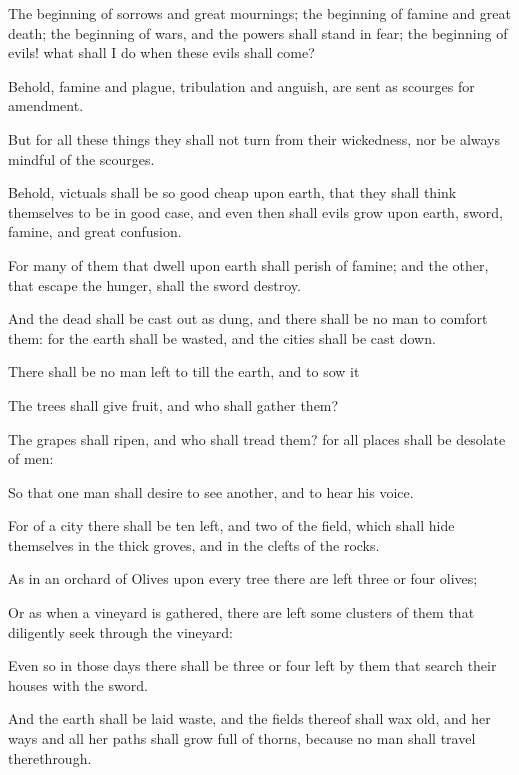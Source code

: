 {\par }{\PP {}The beginning of sorrows and great mournings; the beginning of famine and great death; the beginning of wars, and the powers shall stand in fear; the beginning of evils! what shall I do when these evils shall come?
\par }{\PP {}Behold, famine and plague, tribulation and anguish, are sent as scourges for amendment.
\par }{\PP {}But for all these things they shall not turn from their wickedness, nor be always mindful of the scourges.
\par }{\PP {}Behold, victuals shall be so good cheap upon earth, that they shall think themselves to be in good case, and even then shall evils grow upon earth, sword, famine, and great confusion.
\par }{\PP {}For many of them that dwell upon earth shall perish of famine; and the other, that escape the hunger, shall the sword destroy.
\par }{\PP {}And the dead shall be cast out as dung, and there shall be no man to comfort them: for the earth shall be wasted, and the cities shall be cast down.
\par }{\PP {}There shall be no man left to till the earth, and to sow it
\par }{\PP {}The trees shall give fruit, and who shall gather them?
\par }{\PP {}The grapes shall ripen, and who shall tread them? for all places shall be desolate of men:
\par }{\PP {}So that one man shall desire to see another, and to hear his voice.
\par }{\PP {}For of a city there shall be ten left, and two of the field, which shall hide themselves in the thick groves, and in the clefts of the rocks.
\par }{\PP {}As in an orchard of Olives upon every tree there are left three or four olives;
\par }{\PP {}Or as when a vineyard is gathered, there are left some clusters of them that diligently seek through the vineyard:
\par }{\PP {}Even so in those days there shall be three or four left by them that search their houses with the sword.
\par }{\PP {}And the earth shall be laid waste, and the fields thereof shall wax old, and her ways and all her paths shall grow full of thorns, because no man shall travel therethrough.
}
